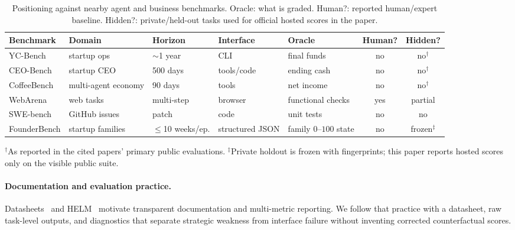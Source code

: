 \documentclass[sigconf,review]{acmart}
\begin{document}
\begin{table}[t]
\caption{Positioning against nearby agent and business benchmarks. Oracle: what is graded. Human?: reported human/expert baseline. Hidden?: private/held-out tasks used for official hosted scores in the paper.}
\label{tab:related}
\centering\scriptsize
\begin{tabular}{p{1.7cm}p{1.55cm}p{1.35cm}p{1.55cm}p{1.55cm}cc}
\toprule
Benchmark & Domain & Horizon & Interface & Oracle & Human? & Hidden? \\
\midrule
YC-Bench~\cite{he2026ycbench} & startup ops & $\sim$1 year & CLI & final funds & no & no$^\dagger$ \\
CEO-Bench & startup CEO & 500 days & tools/code & ending cash & no & no$^\dagger$ \\
CoffeeBench & multi-agent economy & 90 days & tools & net income & no & no$^\dagger$ \\
WebArena~\cite{zhou2024webarena} & web tasks & multi-step & browser & functional checks & yes & partial \\
SWE-bench~\cite{jimenez2024swebench} & GitHub issues & patch & code & unit tests & no & no \\
FounderBench & startup families & $\leq$10 weeks/ep. & structured JSON & family $0$--$100$ state & no & frozen$^\ddagger$ \\
\bottomrule
\end{tabular}
\begin{flushleft}\vspace{-0.4em}\scriptsize
$^\dagger$As reported in the cited papers' primary public evaluations.
$^\ddagger$Private holdout is frozen with fingerprints; this paper reports hosted scores only on the visible public suite.
\end{flushleft}
\end{table}

\paragraph{Documentation and evaluation practice.}
Datasheets~\cite{gebru2021datasheets} and HELM~\cite{liang2023holistic} motivate transparent documentation and multi-metric reporting.
We follow that practice with a datasheet, raw task-level outputs, and diagnostics that separate strategic weakness from interface failure without inventing corrected counterfactual scores.
\end{document}
